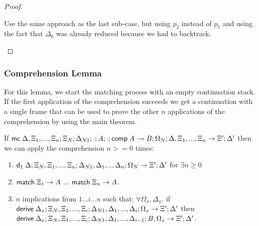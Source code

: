 \begin{proof}
\begin{itemize}
\begin{enumerate}
         Use the same approach as the last sub-case, but using $p_2$ instead of $p_1$ and using the fact that $\Delta_b$ was already reduced because we had to backtrack.
      \end{enumerate}
   \end{itemize}
\end{proof}

\subsubsection{Comprehension Lemma}

For this lemma, we start the matching process with an empty continuation stack. If the first application of the comprehension succeeds we get a continuation with a single frame that can be used to prove the other $n$ applications of the comprehension by using the main theorem.

\begin{lemma}
If $\mathsf{mc} \; \Delta, \Xi_1, ..., \Xi_n; \Xi_N; \Delta_{N1}; \cdot; A; \cdot; \mathsf{comp} \; A \multimap B; \Omega_N; \Delta, \Xi_1, ..., \Xi_n \rightarrow \Xi'; \Delta'$ then we can apply the comprehension $n >= 0$ times:
\begin{enumerate}
   \item $\mathsf{d}_1 \; \Delta; \Xi_N, \Xi_1, ..., \Xi_n; \Delta_{N1}, \Delta_1, .., \Delta_n; \Omega_N \rightarrow \Xi'; \Delta'$ for $\exists n \geq 0$
   \item $\mathsf{match} \; \Xi_1 \rightarrow A$ ... $\mathsf{match} \; \Xi_n \rightarrow A$.
   \item $n$ implications from $1 ... i ... n$ such that: $\forall \Omega_x, \Delta_x.$ if $\mathsf{derive} \; \Delta_x; \Xi_N, \Xi_1, ..., \Xi_i; \Delta_{N1}, \Delta_1, ..., \Delta_i; \Omega_x \rightarrow \Xi'; \Delta'$ then $\mathsf{derive} \; \Delta_x; \Xi_N, \Xi_1, ..., \Xi_i; \Delta_{N1}, \Delta_1, ..., \Delta_{i-1}; B, \Omega_x \rightarrow \Xi'; \Delta'$.
\end{enumerate}
\end{lemma}

